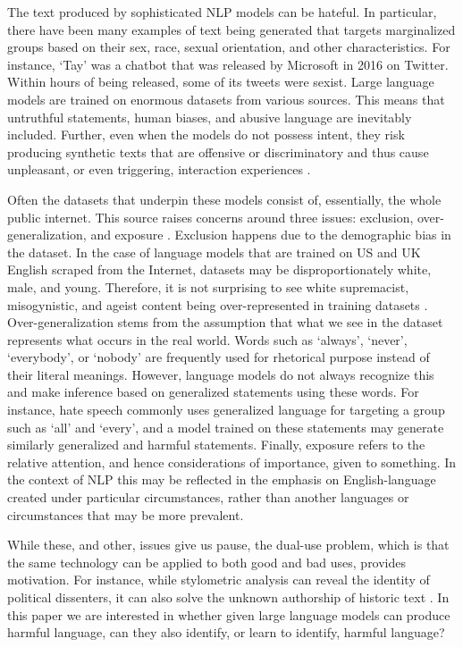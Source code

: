 \documentclass{bmcart}
\begin{document}
The text produced by sophisticated NLP models can be hateful. In particular, there have been many examples of text being generated that targets marginalized groups based on their sex, race, sexual orientation, and other characteristics. For instance, `Tay' was a chatbot that was released by Microsoft in 2016 on Twitter. Within hours of being released, some of its tweets were sexist. Large language models are trained on enormous datasets from various sources. This means that untruthful statements, human biases, and abusive language are inevitably included. Further, even when the models do not possess intent, they risk producing synthetic texts that are offensive or discriminatory and thus cause unpleasant, or even triggering, interaction experiences \cite{bender2021dangers}.

Often the datasets that underpin these models consist of, essentially, the whole public internet. This source raises concerns around three issues: exclusion, over-generalization, and exposure \cite{hovy2016social}. Exclusion happens due to the demographic bias in the dataset. In the case of language models that are trained on US and UK English scraped from the Internet, datasets may be disproportionately white, male, and young. Therefore, it is not surprising to see white supremacist, misogynistic, and ageist content being over-represented in training datasets \cite{bender2021dangers}. Over-generalization stems from the assumption that what we see in the dataset represents what occurs in the real world. Words such as `always', `never', `everybody', or `nobody' are frequently used for rhetorical purpose instead of their literal meanings. However, language models do not always recognize this and make inference based on generalized statements using these words. For instance, hate speech commonly uses generalized language for targeting a group such as `all' and `every', and a model trained on these statements may generate similarly generalized and harmful statements. Finally, exposure refers to the relative attention, and hence considerations of importance, given to something. In the context of NLP this may be reflected in the emphasis on English-language created under particular circumstances, rather than another languages or circumstances that may be more prevalent.

While these, and other, issues give us pause, the dual-use problem, which is that the same technology can be applied to both good and bad uses, provides motivation. For instance, while stylometric analysis can reveal the identity of political dissenters, it can also solve the unknown authorship of historic text \cite{hovy2016social}. In this paper we are interested in whether given large language models can produce harmful language, can they also identify, or learn to identify, harmful language?
\end{document}
